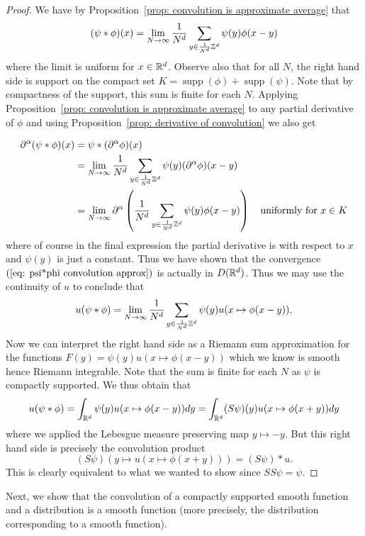 \documentclass[twoside, a4paper, 10pt]{amsart}
\begin{document}
\begin{proof} We have by Proposition~\ref{prop: convolution is approximate average} that \begin{align}\label{eq: psi*phi convolution approx} (\psi * \phi)(x) = \lim_{N \to \infty} \frac{1}{N^d} \sum_{y \in \frac{1}{N^d}\mathbb{Z}^d} \psi(y) \phi(x-y) \end{align} where the limit is uniform for $x \in \mathbb{R}^d$. Observe also that for all $N$, the right hand side is support on the compact set $K = \operatorname{supp}(\phi) + \operatorname{supp}(\psi)$. Note that by compactness of the support, this sum is finite for each $N$. Applying Proposition~\ref{prop: convolution is approximate average} to any partial derivative of $\phi$ and using Proposition~\ref{prop: derivative of convolution}  we also get 

\begin{align*} \partial^{\alpha}(\psi * \phi)(x) &= \psi * (\partial^{\alpha} \phi)(x) \\ &= \lim_{N \to \infty} \frac{1}{N^d} \sum_{y \in \frac{1}{N^d}\mathbb{Z}^d} \psi(y) (\partial^{\alpha}\phi)(x-y) \\&= \lim_{N \to \infty} \partial^{\alpha}\left(\frac{1}{N^d} \sum_{y \in \frac{1}{N^d}\mathbb{Z}^d} \psi(y) \phi(x-y) \right)  \quad\text{uniformly for } x \in K \end{align*} where of course in the final expression the partial derivative is with respect to $x$ and $\psi(y)$ is just a constant. Thus we have shown that the convergence $(\ref{eq: psi*phi convolution approx})$ is actually in $D(\mathbb{R}^d)$. Thus we may use the continuity of $u$ to conclude that $$u(\psi * \phi) = \lim_{N \to \infty} \frac{1}{N^d}  \sum_{y \in \frac{1}{N^d}\mathbb{Z}^d} \psi(y) u(x \mapsto \phi(x-y)).$$ Now we can interpret the right hand side as a Riemann sum approximation for the functions $F(y) = \psi(y)u(x \mapsto \phi(x-y))$ which we know is smooth hence Riemann integrable. Note that the sum is finite for each $N$ as $\psi$ is compactly supported. We thus obtain that $$u(\psi * \phi) = \int_{\mathbb{R}^d} \psi(y)u(x \mapsto \phi(x-y)) dy = \int_{\mathbb{R}^d} (S\psi)(y) u(x \mapsto \phi(x+y)) dy$$ where we applied the Lebesgue measure preserving map $y \mapsto -y$. But this right hand side is precisely the convolution product $$(S\psi)( y \mapsto u(x \mapsto\phi(x+y))) = (S\psi) * u.$$ This is clearly equivalent to what we wanted to show since $SS\psi = \psi.$ \end{proof}

Next, we show that the convolution of a compactly supported smooth function and a distribution is a smooth function (more precisely, the distribution corresponding to a smooth function).
\end{document}
